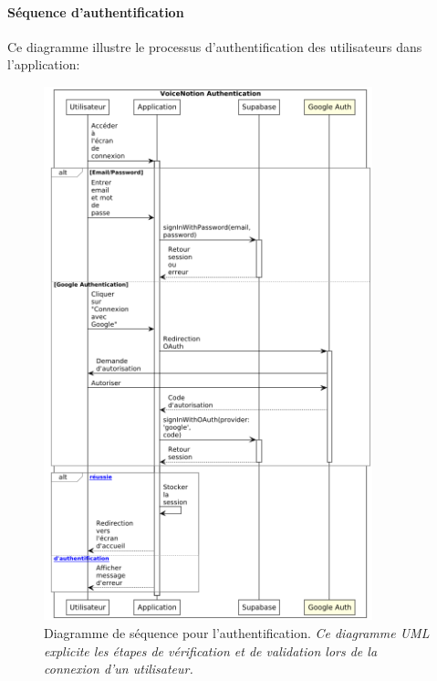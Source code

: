     \paragraph{Séquence d'authentification}
    
    Ce diagramme illustre le processus d'authentification des utilisateurs dans l'application:
    
        \begin{figure}[htbp]
        \centering
        \includegraphics[width=0.85\textwidth]{assets/docs/SayNote_auth_sequence.png}
        \caption{Diagramme de séquence pour l'authentification. \newline\textit{Ce diagramme UML explicite les étapes de vérification et de validation lors de la connexion d'un utilisateur.}}
        \label{fig:sequence_auth}
    \end{figure}
    
